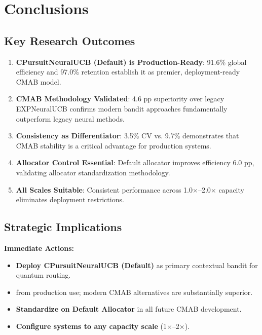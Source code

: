 \documentclass[12pt,a4paper]{article}
\newcommand{\success}[1]{\textcolor{accentgreen}{\textbf{#1}}}
\begin{document}
\section{Conclusions}

\subsection{Key Research Outcomes}

\begin{enumerate}
    \item \success{\textbf{CPursuitNeuralUCB (Default) is Production-Ready}}: 91.6\% global efficiency and 97.0\% retention establish it as premier, deployment-ready CMAB model.
    
    \item \success{\textbf{CMAB Methodology Validated}}: 4.6 pp superiority over legacy EXPNeuralUCB confirms modern bandit approaches fundamentally outperform legacy neural methods.
    
    \item \success{\textbf{Consistency as Differentiator}}: 3.5\% CV vs. 9.7\% demonstrates that CMAB stability is a critical advantage for production systems.
    
    \item \success{\textbf{Allocator Control Essential}}: Default allocator improves efficiency 6.0 pp, validating allocator standardization methodology.
    
    \item \success{\textbf{All Scales Suitable}}: Consistent performance across 1.0$\times$--2.0$\times$ capacity eliminates deployment restrictions.
\end{enumerate}

\subsection{Strategic Implications}

\textbf{Immediate Actions:}
\begin{itemize}
    \item \success{Deploy CPursuitNeuralUCB (Default)} as primary contextual bandit for quantum routing.
    \item {} from production use; modern CMAB alternatives are substantially superior.
    \item \success{Standardize on Default Allocator} in all future CMAB development.
    \item \success{Configure systems to any capacity scale} (1$\times$--2$\times$).
\end{itemize}
\end{document}
